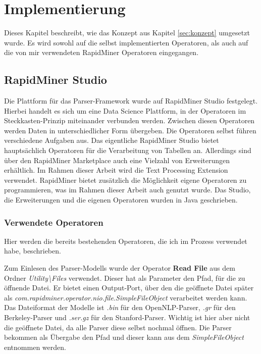 %
\chapter{Implementierung}
\label{sec:impl}
Dieses Kapitel beschreibt, wie das Konzept aus Kapitel \ref{sec:konzept} umgesetzt wurde. Es wird sowohl auf die selbst implementierten Operatoren, als auch auf die von mir verwendeten RapidMiner Operatoren eingegangen. 

\section{RapidMiner Studio}
\label{sec:impl:rms}

Die Plattform für das Parser-Framework wurde auf RapidMiner Studio festgelegt. Hierbei handelt es sich um eine Data Science Plattform, in der Operatoren im Steckkasten-Prinzip miteinander verbunden werden. Zwischen diesen Operatoren werden Daten in unterschiedlicher Form übergeben. Die Operatoren selbst führen verschiedene Aufgaben aus. Das eigentliche RapidMiner Studio bietet hauptsächlich Operatoren für die Verarbeitung von Tabellen an. Allerdings sind über den RapidMiner Marketplace auch eine Vielzahl von Erweiterungen erhältlich. Im Rahmen dieser Arbeit wird die Text Processing Extension %
verwendet. RapidMiner bietet zusätzlich die Möglichkeit eigene Operatoren zu programmieren, was im Rahmen dieser Arbeit auch genutzt wurde. Das Studio, die Erweiterungen und die eigenen Operatoren wurden in Java geschrieben. \\

\subsection{Verwendete Operatoren}

Hier werden die bereits bestehenden Operatoren, die ich im Prozess verwendet habe, beschrieben. 

Zum Einlesen des Parser-Modells wurde der Operator \textbf{Read File} aus dem Ordner \textit{Utility\textbackslash Files} verwendet. Dieser hat als Parameter den Pfad, für die zu öffnende Datei. Er bietet einen Output-Port, über den die geöffnete Datei später als \textit{com.rapidminer.operator.nio.file.SimpleFileObject} verarbeitet werden kann. Das Dateiformat der Modelle ist \textit{.bin} für den OpenNLP-Parser, \textit{.gr} für den Berkeley-Parser und \textit{.ser.gz} für den Stanford-Parser. Wichtig ist hier aber nicht die geöffnete Datei, da alle Parser diese selbst nochmal öffnen. Die Parser bekommen als Übergabe den Pfad und dieser kann aus dem \textit{SimpleFileObject} entnommen werden.


